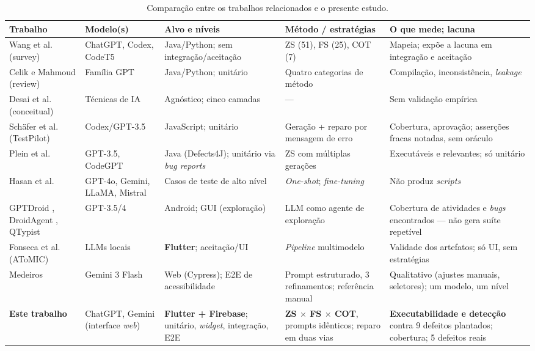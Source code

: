 \documentclass[12pt]{article}
\begin{document}
\begin{table}[!t]
\centering
\caption{Comparação entre os trabalhos relacionados e o presente estudo.}
\label{tab:relacionados}
\renewcommand{\arraystretch}{1.3}
\scriptsize
\begin{tabularx}{\textwidth}{@{}P{3.1cm} P{2.2cm} Y Y Y@{}}
\toprule
\textbf{Trabalho} & \textbf{Modelo(s)} & \textbf{Alvo e níveis} & \textbf{Método / estratégias} & \textbf{O que mede; lacuna} \\
\midrule
Wang et al.\ \cite{wang2024survey} (survey) & ChatGPT, Codex, CodeT5 & Java/Python; sem integração/aceitação & ZS (51), FS (25), COT (7) & Mapeia; expõe a lacuna em integração e aceitação \\
\addlinespace
Celik e Mahmoud \cite{celik2025review} (review) & Família GPT & Java/Python; unitário & Quatro categorias de método & Compilação, inconsistência, \textit{leakage} \\
\addlinespace
Desai et al.\ \cite{desai2025testpyramid} (conceitual) & Técnicas de IA & Agnóstico; cinco camadas & --- & Sem validação empírica \\
\addlinespace
Schäfer et al.\ \cite{schafer2024testpilot} (TestPilot) & Codex/GPT-3.5 & JavaScript; unitário & Geração + reparo por mensagem de erro & Cobertura, aprovação; asserções fracas notadas, sem oráculo \\
\addlinespace
Plein et al.\ \cite{plein2023bugreports} & GPT-3.5, CodeGPT & Java (Defects4J); unitário via \textit{bug reports} & ZS com múltiplas gerações & Executáveis e relevantes; só unitário \\
\addlinespace
Hasan et al.\ \cite{hasan2025highlevel} & GPT-4o, Gemini, LLaMA, Mistral & Casos de teste de alto nível & \textit{One-shot}; \textit{fine-tuning} & Não produz \textit{scripts} \\
\addlinespace
GPTDroid \cite{liu2024gptdroid}, DroidAgent \cite{yoon2024droidagent}, QTypist \cite{liu2023qtypist} & GPT-3.5/4 & Android; GUI (exploração) & LLM como agente de exploração & Cobertura de atividades e \textit{bugs} encontrados --- não gera suíte repetível \\
\addlinespace
Fonseca et al.\ \cite{fonseca2025atomic} (AToMIC) & LLMs locais & \textbf{Flutter}; aceitação/UI & \textit{Pipeline} multimodelo & Validade dos artefatos; só UI, sem estratégias \\
\addlinespace
Medeiros \cite{medeiros2026acessibilidade} & Gemini 3 Flash & Web (Cypress); E2E de acessibilidade & Prompt estruturado, 3 refinamentos; referência manual & Qualitativo (ajustes manuais, seletores); um modelo, um nível \\
\midrule
\textbf{Este trabalho} & ChatGPT, Gemini (interface \textit{web}) & \textbf{Flutter + Firebase}; unitário, \textit{widget}, integração, E2E & \textbf{ZS $\times$ FS $\times$ COT}, prompts idênticos; reparo em duas vias & \textbf{Executabilidade e detecção} contra 9 defeitos plantados; cobertura; 5 defeitos reais \\
\bottomrule
\end{tabularx}
\end{table}
\end{document}
